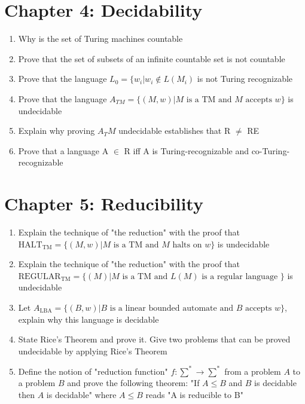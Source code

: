 \documentclass{article}
\begin{document}
\clearpage
\section{Chapter 4: Decidability}

\begin{enumerate}
\item Why is the set of Turing machines countable 

\item Prove that the set of subsets of an infinite countable set is not countable

\item Prove that the language $L_0 = \{ w_i | w_i \notin L(M_i)$ is not Turing recognizable

\item Prove that the language $A_{TM} = \{(M, w) | M \text{ is a TM and } M \text{ accepts } w\}$ is undecidable

\item Explain why proving $A_TM$ undecidable establishes that R $\neq$ RE

\item Prove that a language A $\in$ R iff A is Turing-recognizable and co-Turing-recognizable

\end{enumerate}

\clearpage
\section{Chapter 5: Reducibility}

\begin{enumerate}{}
\item Explain the technique of "the reduction" with the proof that $\text{HALT}_\text{TM} = \{(M, w) | M \text{ is a TM and } M \text{ halts on } w\}$ is undecidable

\item Explain the technique of "the reduction" with the proof that $\text{REGULAR}_\text{TM} = \{(M) | M \text{ is a TM and } L(M) \text{ is a regular language } \}$ is undecidable

\item Let $A_\text{LBA} = \{(B, w) | B \text{ is a linear bounded automate and } B \text{ accepts } w \}$, explain why this language is decidable

\item State Rice’s Theorem and prove it. Give two problems that can be proved
undecidable by applying Rice’s Theorem

\item Define the notion of "reduction function" $f : \sum^{*} \rightarrow \sum^{*}$ from a problem $A$ to a problem $B$ and prove the following theorem: "If $A \leq B$ and $B$ is decidable then $A$ is decidable" where $A \leq B$ reads "A is reducible to B"

\end{enumerate}{}
\end{document}
